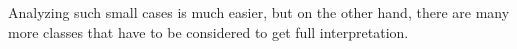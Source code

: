 \documentclass[final]{article}
\theoremstyle{definition}
\theoremstyle{definition}
\theoremstyle{remark}
\newcommand{\includeinlinescaledsvg}[3]{\begin{minipage}{#1\textwidth}\begin{center}\end{center}\end{minipage}}
\begin{document}
\begin{longtable}{| c | c |}

\end{longtable}

Analyzing such small cases is much easier, but on the other hand, there are many more classes that have to be considered to get full interpretation.
\end{document}
